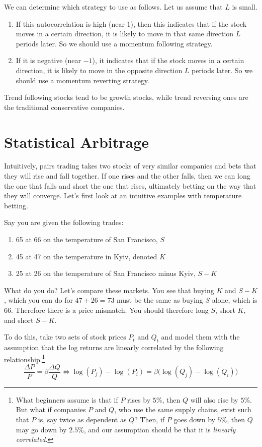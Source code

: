 \documentclass{article}
\begin{document}
    We can determine which strategy to use as follows. Let us assume that $L$ is small.  
    \begin{enumerate}
      \item If this autocorrelation is high (near $1$), then this indicates that if the stock moves in a certain direction, it is likely to move in that same direction $L$ periods later. So we should use a momentum following strategy. 
      \item If it is negative (near $-1$), it indicates that if the stock moves in a certain direction, it is likely to move in the opposite direction $L$ periods later. So we should use a momentum reverting strategy. 
    \end{enumerate}
    Trend following stocks tend to be growth stocks, while trend reversing ones are the traditional conservative companies. 

\section{Statistical Arbitrage}

  Intuitively, pairs trading takes two stocks of very similar companies and bets that they will rise and fall together. If one rises and the other falls, then we can long the one that falls and short the one that rises, ultimately betting on the way that they will converge. Let's first look at an intuitive examples with temperature betting. 

  \begin{example}
    \label{ex:temperatrue-arbitrage}
    Say you are given the following trades:
    \begin{enumerate}
      \item 65 at 66 on the temperature of San Francisco, $S$
      \item 45 at 47 on the temperature in Kyiv, denoted $K$
      \item 25 at 26 on the temperature of San Francisco minus Kyiv, $S - K$ 
    \end{enumerate}
    What do you do? Let's compare these markets. You see that buying $K$ and $S - K$, which you can do for $47 + 26 = 73$ must be the same as buying $S$ alone, which is $66$. Therefore there is a price mismatch. You should therefore long $S$, short $K$, and short $S - K$. 
  \end{example}

  To do this, take two sets of stock prices $P_t$ and $Q_t$ and model them with the assumption that the log returns are linearly correlated by the following relationship.\footnote{What beginners assume is that if $P$ rises by $5\%$, then $Q$ will also rise by $5\%$. But what if companies $P$ and $Q$, who use the same supply chains, exist such that $P$ is, say twice as dependent as $Q$? Then, if $P$ goes down by $5\%$, then $Q$ may go down by $2.5\%$, and our assumption should be that it is \textit{linearly correlated}. }
  \begin{equation}
    \frac{\Delta P}{P} = \beta \frac{\Delta Q}{Q} \iff \log(P_j) - \log(P_i) = \beta \big( \log(Q_j) - \log(Q_i) \big)
  \end{equation}
\end{document}
